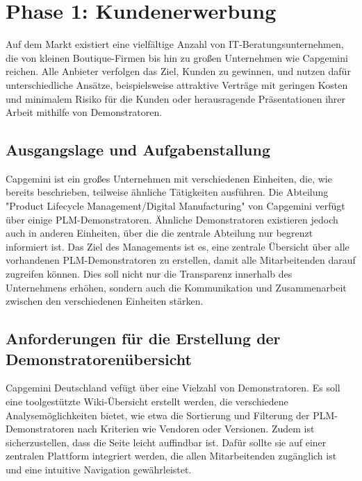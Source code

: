 \chapter{Phase 1: Kundenerwerbung} 
Auf dem Markt existiert eine vielfältige Anzahl von IT-Beratungsunternehmen, die von kleinen Boutique-Firmen bis hin zu großen Unternehmen wie Capgemini reichen. Alle Anbieter verfolgen das Ziel, Kunden zu gewinnen, und nutzen dafür unterschiedliche Ansätze, beispielsweise attraktive Verträge mit geringen Kosten und minimalem Risiko für die Kunden oder herausragende Präsentationen ihrer Arbeit mithilfe von Demonstratoren\cite{muhonen2013qualification}.
\section{Ausgangslage und Aufgabenstallung} %
Capgemini ist ein großes Unternehmen mit verschiedenen Einheiten, die, wie bereits beschrieben, teilweise ähnliche Tätigkeiten ausführen. Die Abteilung "Product Lifecycle Management/Digital Manufacturing" von Capgemini \cite{Capgemini} verfügt über einige PLM-Demonstratoren. Ähnliche Demonstratoren existieren jedoch auch in anderen Einheiten, über die die zentrale Abteilung nur begrenzt informiert ist.\newline
Das Ziel des Managements ist es, eine zentrale Übersicht über alle vorhandenen PLM-Demonstratoren zu erstellen, damit alle Mitarbeitenden darauf zugreifen können. Dies soll nicht nur die Transparenz innerhalb des Unternehmens erhöhen, sondern auch die Kommunikation und Zusammenarbeit zwischen den verschiedenen Einheiten stärken.
\section{Anforderungen für die Erstellung der Demonstratorenübersicht} %
Capgemini Deutschland vefügt über eine Vielzahl von Demonstratoren. Es soll eine toolgestützte Wiki-Übersicht erstellt werden, die verschiedene Analysemöglichkeiten bietet, wie etwa die Sortierung und Filterung der PLM-Demonstratoren nach Kriterien wie Vendoren oder Versionen.
Zudem ist sicherzustellen, dass die Seite leicht auffindbar ist. Dafür sollte sie auf einer zentralen Plattform integriert werden, die allen Mitarbeitenden zugänglich ist und eine intuitive Navigation gewährleistet.
